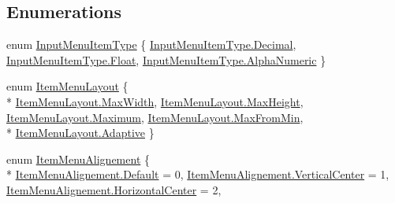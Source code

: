 \subsection*{Enumerations}
\begin{DoxyCompactItemize}
\item 
enum \hyperlink{namespacegearit_1_1src_1_1utility_1_1_menu_a417a5e1addbcf587ddaa7eed08d5fe73}{Input\+Menu\+Item\+Type} \{ \hyperlink{namespacegearit_1_1src_1_1utility_1_1_menu_a417a5e1addbcf587ddaa7eed08d5fe73a937504f318f04eaf0f1d701df4c4d7f3}{Input\+Menu\+Item\+Type.\+Decimal}, 
\hyperlink{namespacegearit_1_1src_1_1utility_1_1_menu_a417a5e1addbcf587ddaa7eed08d5fe73a22ae0e2b89e5e3d477f988cc36d3272b}{Input\+Menu\+Item\+Type.\+Float}, 
\hyperlink{namespacegearit_1_1src_1_1utility_1_1_menu_a417a5e1addbcf587ddaa7eed08d5fe73af522f96d2f06ea9b17be5058b38060ce}{Input\+Menu\+Item\+Type.\+Alpha\+Numeric}
 \}
\item 
enum \hyperlink{namespacegearit_1_1src_1_1utility_1_1_menu_a3ca3e98c7e2f44227e0fd6263822c56a}{Item\+Menu\+Layout} \{ \\*
\hyperlink{namespacegearit_1_1src_1_1utility_1_1_menu_a3ca3e98c7e2f44227e0fd6263822c56aada2861bd822eace4e9fab340cb596dae}{Item\+Menu\+Layout.\+Max\+Width}, 
\hyperlink{namespacegearit_1_1src_1_1utility_1_1_menu_a3ca3e98c7e2f44227e0fd6263822c56aa6872355c934b9dcaa090dbdc4afa83c2}{Item\+Menu\+Layout.\+Max\+Height}, 
\hyperlink{namespacegearit_1_1src_1_1utility_1_1_menu_a3ca3e98c7e2f44227e0fd6263822c56aa8321e79c278ec510f63675c040594892}{Item\+Menu\+Layout.\+Maximum}, 
\hyperlink{namespacegearit_1_1src_1_1utility_1_1_menu_a3ca3e98c7e2f44227e0fd6263822c56aa9b2cb1043cc8308e38af2fc16997c64d}{Item\+Menu\+Layout.\+Max\+From\+Min}, 
\\*
\hyperlink{namespacegearit_1_1src_1_1utility_1_1_menu_a3ca3e98c7e2f44227e0fd6263822c56aa1244cba6ca79bfda45de46141d32ea7b}{Item\+Menu\+Layout.\+Adaptive}
 \}
\item 
enum \hyperlink{namespacegearit_1_1src_1_1utility_1_1_menu_a4312fcb06a1685782d1246bfeefdbd3b}{Item\+Menu\+Alignement} \{ \\*
\hyperlink{namespacegearit_1_1src_1_1utility_1_1_menu_a4312fcb06a1685782d1246bfeefdbd3ba7a1920d61156abc05a60135aefe8bc67}{Item\+Menu\+Alignement.\+Default} = 0, 
\hyperlink{namespacegearit_1_1src_1_1utility_1_1_menu_a4312fcb06a1685782d1246bfeefdbd3baa9f8626c4f149f94159e461c9cdac139}{Item\+Menu\+Alignement.\+Vertical\+Center} = 1, 
\hyperlink{namespacegearit_1_1src_1_1utility_1_1_menu_a4312fcb06a1685782d1246bfeefdbd3ba818fc5734a63e5098183005f65adb99f}{Item\+Menu\+Alignement.\+Horizontal\+Center} = 2, 

\end{DoxyCompactItemize}
